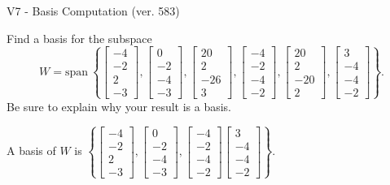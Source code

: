 \begin{exercise}
  \begin{exerciseTitle}V7 - Basis Computation (ver. 583)\end{exerciseTitle}
  \begin{exerciseStatement}
    Find a basis for the subspace 
\[W=\mathrm{span}\ \left\{\left[\begin{array}{r}
-4 \\
-2 \\
2 \\
-3
\end{array}\right] , \left[\begin{array}{r}
0 \\
-2 \\
-4 \\
-3
\end{array}\right] , \left[\begin{array}{r}
20 \\
2 \\
-26 \\
3
\end{array}\right] , \left[\begin{array}{r}
-4 \\
-2 \\
-4 \\
-2
\end{array}\right] , \left[\begin{array}{r}
20 \\
2 \\
-20 \\
2
\end{array}\right] , \left[\begin{array}{r}
3 \\
-4 \\
-4 \\
-2
\end{array}\right]\right\}.\]
 Be sure to explain why your result is a basis.


  \end{exerciseStatement}
  \begin{exerciseAnswer}
   A basis of \(W\) is  \(\left\{\left[\begin{array}{r}
-4 \\
-2 \\
2 \\
-3
\end{array}\right] , \left[\begin{array}{r}
0 \\
-2 \\
-4 \\
-3
\end{array}\right] , \left[\begin{array}{r}
-4 \\
-2 \\
-4 \\
-2
\end{array}\right] \left[\begin{array}{r}
3 \\
-4 \\
-4 \\
-2
\end{array}\right]\right\}\).
  


  \end{exerciseAnswer}
\end{exercise}